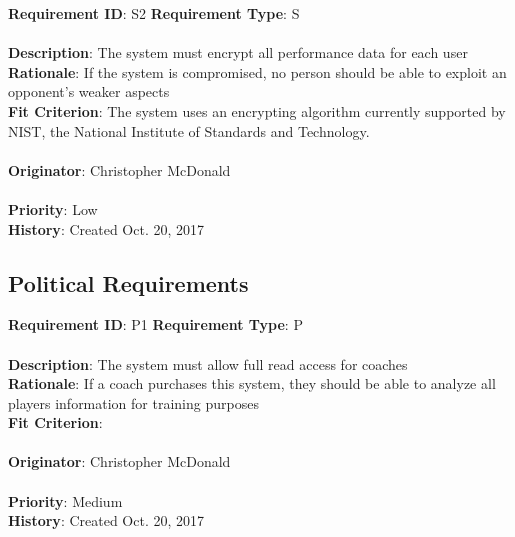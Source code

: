 \documentclass[11pt]{article}
\begin{document}
\begin{framed}
	\noindent\textbf{Requirement ID}: S2 \hfill \textbf{Requirement Type}: S \hfill\\\\
	\noindent\textbf{Description}: The system must encrypt all performance data for each user \\
	\textbf{Rationale}: If the system is compromised, no person should be able to exploit an opponent's weaker aspects \\
	\textbf{Fit Criterion}: The system uses an encrypting algorithm currently supported by NIST, the National Institute of Standards and Technology.\\\\
	\textbf{Originator}: Christopher McDonald \\\\
	\textbf{Priority}: Low \hfill \\
	\noindent\textbf{History}: Created Oct. 20, 2017
\end{framed}

\subsection{Political Requirements}
\begin{framed}
	\noindent\textbf{Requirement ID}: P1 \hfill \textbf{Requirement Type}: P \hfill\\\\
	\noindent\textbf{Description}: The system must allow full read access for coaches \\
	\textbf{Rationale}: If a coach purchases this system, they should be able to analyze all players information for training purposes \\
	\textbf{Fit Criterion}: \\\\
	\textbf{Originator}: Christopher McDonald \\\\
	\textbf{Priority}: Medium \hfill \\
	\noindent\textbf{History}: Created Oct. 20, 2017
\end{framed}
\end{document}

